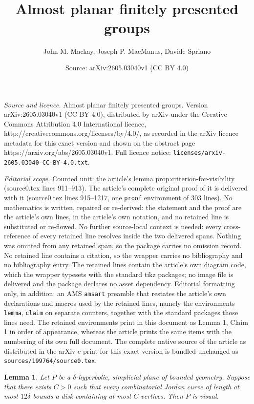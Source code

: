 \documentclass[10pt,a4paper]{amsart}
\title{Almost planar finitely presented groups}
\author{John M. Mackay, Joseph P. MacManus, Davide Spriano}
\date{Source: arXiv:2605.03040v1 (CC BY 4.0)}
\newtheorem{lemma}{Lemma}
\begin{document}
\maketitle

\noindent\emph{Source and licence.} Almost planar finitely presented groups. Version arXiv:2605.03040v1 (CC BY 4.0), distributed by arXiv under the Creative Commons Attribution 4.0 International licence, http://creativecommons.org/licenses/by/4.0/, as recorded in the arXiv licence metadata for this exact version and shown on the abstract page https://arxiv.org/abs/2605.03040v1. Full licence notice: \texttt{licenses/arxiv-2605.03040-CC-BY-4.0.txt}.\par\smallskip

\noindent\textit{Editorial scope.} Counted unit: the article's lemma prop:criterion-for-visibility (source0.tex lines 911--913). The article's complete original proof of it is delivered with it (source0.tex lines 915--1217, one \texttt{proof} environment of 303 lines). No mathematics is written, repaired or re-derived: the statement and the proof are the article's own lines, in the article's own notation, and no retained line is substituted or re-flowed.  No further source-local context is needed: every cross-reference of every retained line resolves inside the two delivered spans.  Nothing was omitted from any retained span, so the package carries no omission record.  No retained line contains a citation, so the wrapper carries no bibliography and no bibliography entry.  The retained lines contain the article's own diagram code, which the wrapper typesets with the standard tikz packages; no image file is delivered and the package declares no asset dependency.  Editorial formatting only, in addition: an AMS \texttt{amsart} preamble that restates the article's own declarations and macros used by the retained lines, namely the environments \texttt{lemma}, \texttt{claim} on separate counters, together with the standard packages those lines need.  The retained environments print in this document as Lemma 1, Claim 1 in order of appearance, whereas the article prints the same items with the numbering of its own full document.  The complete native source of the article as distributed in the arXiv e-print for this exact version is bundled unchanged as \texttt{sources/199764/source0.tex}.
\begin{lemma}\label{prop:criterion-for-visibility}
	Let $P$ be a $\delta$-hyperbolic, simplicial plane of bounded geometry. Suppose that there exists $C > 0$ such that every combinatorial Jordan curve of length at most $12\delta$ bounds a disk containing at most $C$ vertices. Then $P$ is visual. 
\end{lemma}
\end{document}
